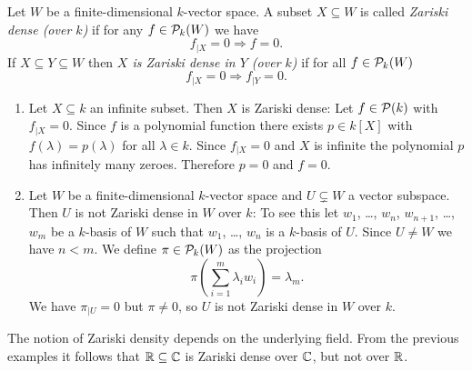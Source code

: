 \begin{defi}
  Let $W$ be a finite-dimensional $k$-vector space.
  A subset $X \subseteq W$ is called \emph{Zariski dense (over $k$)} if for any $f \in \mathcal{P}_k(W)$ we have
  \[
                f_{|X} = 0
    \Rightarrow f = 0.
  \]
  If $X \subseteq Y \subseteq W$ then \emph{$X$ is Zariski dense in $Y$ (over $k$)} if for all $f \in \mathcal{P}_k(W)$
  \[
                f_{|X} = 0
    \Rightarrow f_{|Y} = 0.
  \]
\end{defi}


\begin{expls}
  \begin{enumerate}[label=\emph{\alph*)},leftmargin=*]
    \item 
      Let $X \subseteq k$ an infinite subset.
      Then $X$ is Zariski dense:
      Let $f \in \mathcal{P}(k)$ with $f_{|X} = 0$.
      Since $f$ is a polynomial function there exists $p \in k[X]$ with $f(\lambda) = p(\lambda)$ for all $\lambda \in k$.
      Since $f_{|X} = 0$ and $X$ is infinite the polynomial $p$ has infinitely many zeroes.
      Therefore $p = 0$ and $f = 0$.
    \item
      Let $W$ be a finite-dimensional $k$-vector space and $U \subsetneq W$ a vector subspace.
      Then $U$ is not Zariski dense in $W$ over $k$:
      To see this let $w_1$, \dots, $w_n$, $w_{n+1}$, \dots, $w_m$ be a $k$-basis of $W$ such that $w_1$, \dots, $w_n$ is a $k$-basis of $U$.
      Since $U \neq W$ we have $n < m$.
      We define $\pi \in \mathcal{P}_k(W)$ as the projection
      \[
          \pi\left( \sum_{i=1}^m \lambda_i w_i \right)
        = \lambda_m.
      \]
      We have $\pi_{|U} = 0$ but $\pi \neq 0$, so $U$ is not Zariski dense in $W$ over $k$.
  \end{enumerate}
\end{expls}


\begin{warn}
  The notion of Zariski density depends on the underlying field.
  From the previous examples it follows that $\mathbb{R} \subseteq \mathbb{C}$ is Zariski dense over $\mathbb{C}$, but not over $\mathbb{R}$.
\end{warn}



